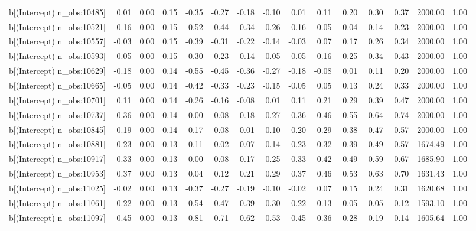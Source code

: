 \begin{table}[ht]
\begin{tabular}{rrrrrrrrrrrrrrr}
  b[(Intercept) n\_obs:10485] & 0.01 & 0.00 & 0.15 & -0.35 & -0.27 & -0.18 & -0.10 & 0.01 & 0.11 & 0.20 & 0.30 & 0.37 & 2000.00 & 1.00 \\ 
  b[(Intercept) n\_obs:10521] & -0.16 & 0.00 & 0.15 & -0.52 & -0.44 & -0.34 & -0.26 & -0.16 & -0.05 & 0.04 & 0.14 & 0.23 & 2000.00 & 1.00 \\ 
  b[(Intercept) n\_obs:10557] & -0.03 & 0.00 & 0.15 & -0.39 & -0.31 & -0.22 & -0.14 & -0.03 & 0.07 & 0.17 & 0.26 & 0.34 & 2000.00 & 1.00 \\ 
  b[(Intercept) n\_obs:10593] & 0.05 & 0.00 & 0.15 & -0.30 & -0.23 & -0.14 & -0.05 & 0.05 & 0.16 & 0.25 & 0.34 & 0.43 & 2000.00 & 1.00 \\ 
  b[(Intercept) n\_obs:10629] & -0.18 & 0.00 & 0.14 & -0.55 & -0.45 & -0.36 & -0.27 & -0.18 & -0.08 & 0.01 & 0.11 & 0.20 & 2000.00 & 1.00 \\ 
  b[(Intercept) n\_obs:10665] & -0.05 & 0.00 & 0.14 & -0.42 & -0.33 & -0.23 & -0.15 & -0.05 & 0.05 & 0.13 & 0.24 & 0.33 & 2000.00 & 1.00 \\ 
  b[(Intercept) n\_obs:10701] & 0.11 & 0.00 & 0.14 & -0.26 & -0.16 & -0.08 & 0.01 & 0.11 & 0.21 & 0.29 & 0.39 & 0.47 & 2000.00 & 1.00 \\ 
  b[(Intercept) n\_obs:10737] & 0.36 & 0.00 & 0.14 & -0.00 & 0.08 & 0.18 & 0.27 & 0.36 & 0.46 & 0.55 & 0.64 & 0.74 & 2000.00 & 1.00 \\ 
  b[(Intercept) n\_obs:10845] & 0.19 & 0.00 & 0.14 & -0.17 & -0.08 & 0.01 & 0.10 & 0.20 & 0.29 & 0.38 & 0.47 & 0.57 & 2000.00 & 1.00 \\ 
  b[(Intercept) n\_obs:10881] & 0.23 & 0.00 & 0.13 & -0.11 & -0.02 & 0.07 & 0.14 & 0.23 & 0.32 & 0.39 & 0.49 & 0.57 & 1674.49 & 1.00 \\ 
  b[(Intercept) n\_obs:10917] & 0.33 & 0.00 & 0.13 & 0.00 & 0.08 & 0.17 & 0.25 & 0.33 & 0.42 & 0.49 & 0.59 & 0.67 & 1685.90 & 1.00 \\ 
  b[(Intercept) n\_obs:10953] & 0.37 & 0.00 & 0.13 & 0.04 & 0.12 & 0.21 & 0.29 & 0.37 & 0.46 & 0.53 & 0.63 & 0.70 & 1631.43 & 1.00 \\ 
  b[(Intercept) n\_obs:11025] & -0.02 & 0.00 & 0.13 & -0.37 & -0.27 & -0.19 & -0.10 & -0.02 & 0.07 & 0.15 & 0.24 & 0.31 & 1620.68 & 1.00 \\ 
  b[(Intercept) n\_obs:11061] & -0.22 & 0.00 & 0.13 & -0.54 & -0.47 & -0.39 & -0.30 & -0.22 & -0.13 & -0.05 & 0.05 & 0.12 & 1593.10 & 1.00 \\ 
  b[(Intercept) n\_obs:11097] & -0.45 & 0.00 & 0.13 & -0.81 & -0.71 & -0.62 & -0.53 & -0.45 & -0.36 & -0.28 & -0.19 & -0.14 & 1605.64 & 1.00 \\ 

\end{tabular}
\end{table}
